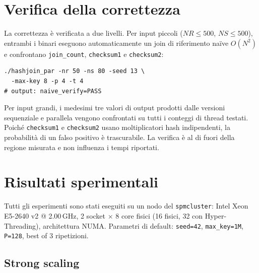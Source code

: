 \documentclass[10pt,a4paper,twocolumn]{article}
\begin{document}
\section{Verifica della correttezza}

La correttezza è verificata a due livelli. Per input piccoli ($NR \leq 500$, $NS \leq 500$), entrambi i binari eseguono automaticamente un join di riferimento naïve $O(N^2)$ e confrontano \texttt{join\_count}, \texttt{checksum1} e \texttt{checksum2}:

\begin{lstlisting}
./hashjoin_par -nr 50 -ns 80 -seed 13 \
  -max-key 8 -p 4 -t 4
# output: naive_verify=PASS
\end{lstlisting}

Per input grandi, i medesimi tre valori di output prodotti dalle versioni sequenziale e parallela vengono confrontati su tutti i conteggi di thread testati. Poiché \texttt{checksum1} e \texttt{checksum2} usano moltiplicatori hash indipendenti, la probabilità di un falso positivo è trascurabile. La verifica è al di fuori della regione misurata e non influenza i tempi riportati.

\section{Risultati sperimentali}
\label{sec:results}

Tutti gli esperimenti sono stati eseguiti su un nodo del \texttt{spmcluster}: Intel Xeon E5-2640 v2 @ 2.00\,GHz, 2 socket $\times$ 8 core fisici (16 fisici, 32 con Hyper-Threading), architettura NUMA. Parametri di default: \texttt{seed=42}, \texttt{max\_key=1M}, \texttt{P=128}, best of 3 ripetizioni.

\subsection*{Strong scaling}
\end{document}
